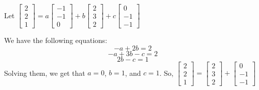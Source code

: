 \begin{enumerate}[label=(\alph*)]
{    Let $\begin{bmatrix}2 \\ 2 \\ 1\end{bmatrix} = a\begin{bmatrix}-1 \\ -1 \\ 0\end{bmatrix} + b\begin{bmatrix}2 \\ 3 \\ 2\end{bmatrix} + c\begin{bmatrix}0 \\ -1 \\ -1\end{bmatrix}$
    
    We have the following equations:
    $$-a + 2b = 2$$
    $$-a + 3b - c = 2$$
    $$2b - c = 1$$
    Solving them, we get that $a = 0$, $b = 1$, and $c = 1$. So, $\begin{bmatrix}2 \\ 2 \\ 1\end{bmatrix} = \begin{bmatrix}2 \\ 3 \\ 2\end{bmatrix} + \begin{bmatrix}0 \\ -1 \\ -1\end{bmatrix}$ 
    
}
\end{enumerate}

